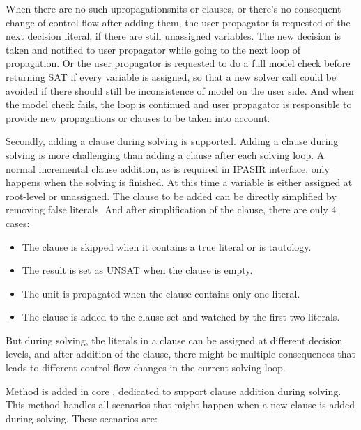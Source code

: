 When there are no such upropagationsnits or clauses, or there's no consequent change of control flow after adding them, the user propagator is requested of the next decision literal, if there are still unassigned variables. The new decision is taken and notified to user propagator while going to the next loop of propagation. Or the user propagator is requested to do a full model check before returning SAT if every variable is assigned, so that a new solver call could be avoided if there should still be inconsistence of model on the user side. And when the model check fails, the loop is continued and user propagator is responsible to provide new propagations or clauses to be taken into account.

Secondly, adding a clause during solving is supported. Adding a clause during solving is more challenging than adding a clause after each solving loop. A normal incremental clause addition, as is required in IPASIR interface, only happens when the solving is finished. At this time a variable is either assigned at root-level or unassigned. The clause to be added can be directly simplified by removing false literals. And after simplification of the clause, there are only 4 cases:

\begin{itemize}
  \item The clause is skipped when it contains a true literal or is tautology.
  \item The result is set as UNSAT when the clause is empty.
  \item The unit is propagated when the clause contains only one literal.
  \item The clause is added to the clause set and watched by the first two literals.
\end{itemize}

But during solving, the literals in a clause can be assigned at different decision levels, and after addition of the clause, there might be multiple consequences that leads to different control flow changes in the current solving loop.

Method  is added in core , dedicated to support clause addition during solving. This method handles all scenarios that might happen when a new clause is added during solving. These scenarios are:


